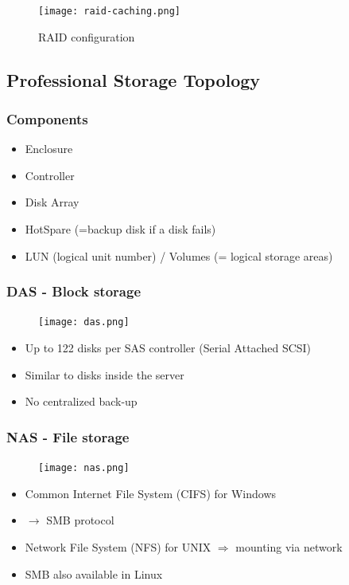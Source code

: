 \documentclass{article}
\begin{document}
\begin{figure}[H]
    \centering
    \texttt{[image: raid-caching.png]}
    \caption{RAID configuration}
\end{figure}


\subsection{Professional Storage Topology}

\subsubsection{Components}

\begin{itemize}
    \item Enclosure
    \item Controller
    \item Disk Array
    \item HotSpare (=backup disk if a disk fails)
    \item LUN (logical unit number) / Volumes (= logical storage areas)
\end{itemize}

\subsubsection{DAS - Block storage}

\begin{figure}[H]
    \centering
    \texttt{[image: das.png]}
\end{figure}

\begin{itemize}
    \item Up to 122 disks per SAS controller (Serial Attached SCSI)
    \item Similar to disks inside the server
    \item No centralized back-up
\end{itemize}


\subsubsection{NAS - File storage}

\begin{figure}[H]
    \centering
    \texttt{[image: nas.png]}
\end{figure}

\begin{itemize}
    \item Common Internet File System (CIFS) for Windows
    \item $\rightarrow$ SMB protocol
    \item Network File System (NFS) for UNIX $\Rightarrow$ mounting via network
    \item SMB also available in Linux
\end{itemize}
\end{document}
